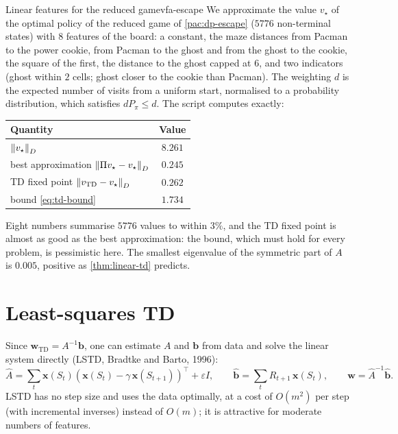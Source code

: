 \begin{pacman}{Linear features for the reduced game}{vfa-escape}
  We approximate the value $v_\star$ of the optimal policy of the reduced
  game of \cref{pac:dp-escape} ($5776$ non-terminal states) with $8$
  features of the board: a constant, the maze distances from Pacman to the
  power cookie, from Pacman to the ghost and from the ghost to the cookie,
  the square of the first, the distance to the ghost capped at $6$, and
  two indicators (ghost within $2$ cells; ghost closer to the cookie than
  Pacman). The weighting $d$ is the expected number of visits from a
  uniform start, normalised to a probability distribution, which satisfies
  $d P_\pi \leq d$. The script
   computes exactly:
  \begin{center}
    \begin{tabular}{@{}lc@{}}
      \toprule
      Quantity & Value \\
      \midrule
      $\left\lVert v_\star \right\rVert_D$ & $8.261$ \\
      best approximation $\left\lVert \Pi v_\star - v_\star \right\rVert_D$ & $0.245$ \\
      TD fixed point $\left\lVert v_{\mathrm{TD}} - v_\star \right\rVert_D$ & $0.262$ \\
      bound \eqref{eq:td-bound} & $1.734$ \\
      \bottomrule
    \end{tabular}
  \end{center}
  Eight numbers summarise $5776$ values to within $3\%$, and the TD fixed
  point is almost as good as the best approximation: the bound, which must
  hold for every problem, is pessimistic here. The smallest eigenvalue of
  the symmetric part of $A$ is $0.005$, positive as
  \cref{thm:linear-td} predicts.
\end{pacman}

\section{Least-squares TD}

Since $\mathbf{w}_{\mathrm{TD}} = A^{-1} \mathbf{b}$, one can estimate $A$
and $\mathbf{b}$ from data and solve the linear system directly
(LSTD, Bradtke and Barto, 1996):
\begin{equation}
  \hat A = \sum_t \mathbf{x}(S_t) \left( \mathbf{x}(S_t) - \gamma\,
  \mathbf{x}(S_{t+1}) \right)^\top + \varepsilon I, \qquad
  \hat{\mathbf{b}} = \sum_t R_{t+1}\, \mathbf{x}(S_t), \qquad
  \mathbf{w} = \hat A^{-1} \hat{\mathbf{b}}.
\end{equation}
LSTD has no step size and uses the data optimally, at a cost of $O(m^2)$
per step (with incremental inverses) instead of $O(m)$; it is attractive
for moderate numbers of features.

